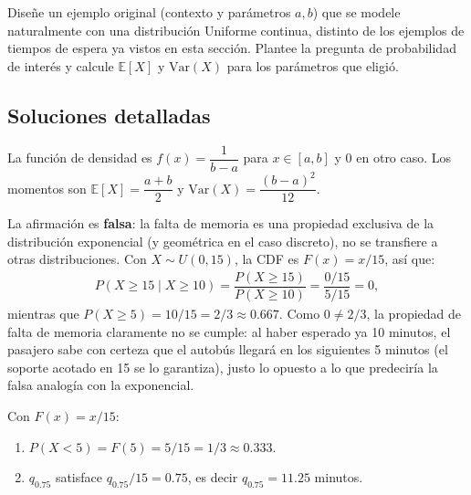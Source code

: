 \begin{problema}
	\label{prob:c1c6ece}
	Diseñe un ejemplo original (contexto y parámetros $a,b$) que se modele naturalmente con una distribución Uniforme continua, distinto de los ejemplos de tiempos de espera ya vistos en esta sección. Plantee la pregunta de probabilidad de interés y calcule $\mathbb{E}[X]$ y $\text{Var}(X)$ para los parámetros que eligió.
\end{problema}

\subsection*{Soluciones detalladas}

\begin{solproblema}[prob:97c4388]
	La función de densidad es $f(x) = \dfrac{1}{b-a}$ para $x \in [a,b]$ y $0$ en otro caso. Los momentos son $\mathbb{E}[X] = \dfrac{a+b}{2}$ y $\text{Var}(X) = \dfrac{(b-a)^2}{12}$.
\end{solproblema}

\begin{solproblema}[prob:9f6e77c]
	La afirmación es \textbf{falsa}: la falta de memoria es una propiedad exclusiva de la distribución exponencial (y geométrica en el caso discreto), no se transfiere a otras distribuciones. Con $X \sim U(0,15)$, la CDF es $F(x)=x/15$, así que:
	\begin{align*}
		P(X \ge 15 \mid X \ge 10) = \dfrac{P(X\ge15)}{P(X\ge10)} = \dfrac{0/15}{5/15} = 0,
	\end{align*}
	mientras que $P(X\ge5) = 10/15 = 2/3 \approx 0.667$. Como $0 \neq 2/3$, la propiedad de falta de memoria claramente no se cumple: al haber esperado ya 10 minutos, el pasajero sabe con certeza que el autobús llegará en los siguientes 5 minutos (el soporte acotado en 15 se lo garantiza), justo lo opuesto a lo que predeciría la falsa analogía con la exponencial.
\end{solproblema}

\begin{solproblema}
	Con $F(x) = x/15$:
	\begin{enumerate}
		\item $P(X<5) = F(5) = 5/15 = 1/3 \approx 0.333$.
		\item $q_{0.75}$ satisface $q_{0.75}/15 = 0.75$, es decir $q_{0.75} = 11.25$ minutos.
	\end{enumerate}
\end{solproblema}

